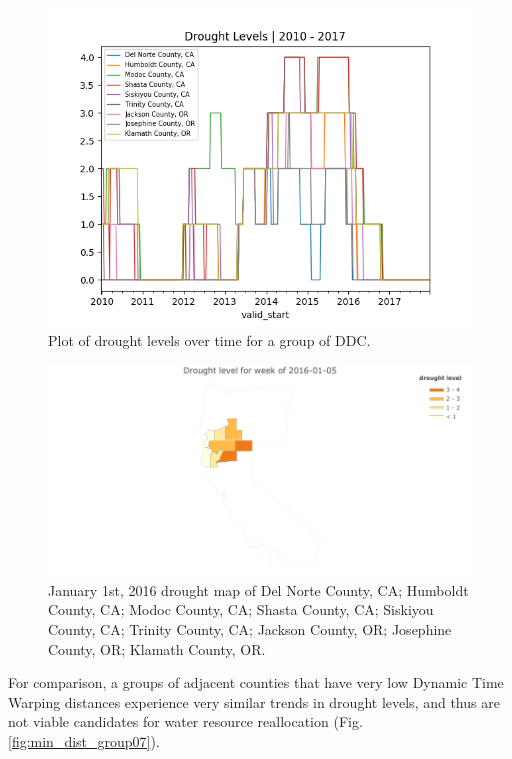 \documentclass{article}
\begin{document}
\begin{figure}[hbt!]
    \centering
    \includegraphics[width = 0.8 \textwidth]{max_dist_group16.png}
    \caption{Plot of drought levels over time for a group of DDC.}
    \label{fig:maxdist_grp16}
\end{figure}


\begin{figure}[hbt!]
    \centering
    \includegraphics[width = \textwidth]{DroughtLevel_group16__wk_2016-01-05.png}
    \caption{January 1st, 2016 drought map of 
    Del Norte County, CA; 
    Humboldt County, CA;
    Modoc County, CA;
    Shasta County, CA;
    Siskiyou County, CA;
    Trinity County, CA;
    Jackson County, OR;
    Josephine County, OR;
    Klamath County, OR.}
    \label{fig:grp16}
\end{figure}

For comparison, a groups of adjacent counties that have very low Dynamic Time Warping distances experience very similar trends in drought levels, and thus are not viable candidates for water resource reallocation (Fig. \ref{fig:min_dist_group07}). 
\end{document}
